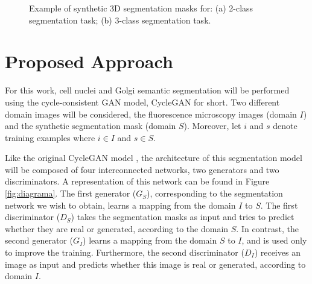 \begin{figure}[!htb]
	\centering
	\hfil
	\caption[Example of synthetic 3D segmentation masks for: (a) 2-class segmentation task; (b) 3-class segmentation task.]{Example of synthetic \ac{3D} segmentation masks for: (a) 2-class segmentation task; (b) 3-class segmentation task.}
	\label{fig:sintetica}
\end{figure}


\section{Proposed Approach}
\label{section:proposed}

For this work, cell nuclei and Golgi semantic segmentation will be performed using the cycle-consistent GAN model, CycleGAN for short. Two different domain images will be considered, the fluorescence microscopy images (domain $I$) and the synthetic segmentation mask (domain $S$). Moreover, let $i$ and $s$ denote training examples where $i \in I$ and $s \in S$.

Like the original CycleGAN model \cite{cycleGAN:original}, the architecture of this segmentation model will be composed of four interconnected networks, two generators and two discriminators. A representation of this network can be found in Figure \ref{fig:diagrama}. The first generator ($G_S$), corresponding to the segmentation network we wish to obtain, learns a mapping from the domain $I$ to $S$. The first discriminator ($D_S$) takes the segmentation masks as input and tries to predict whether they are real or generated, according to the domain $S$. In contrast, the second generator ($G_I$) learns a mapping from the domain $S$ to $I$, and is used only to improve the training. Furthermore, the second discriminator ($D_I$) receives an image as input and predicts whether this image is real or generated, according to domain $I$.


